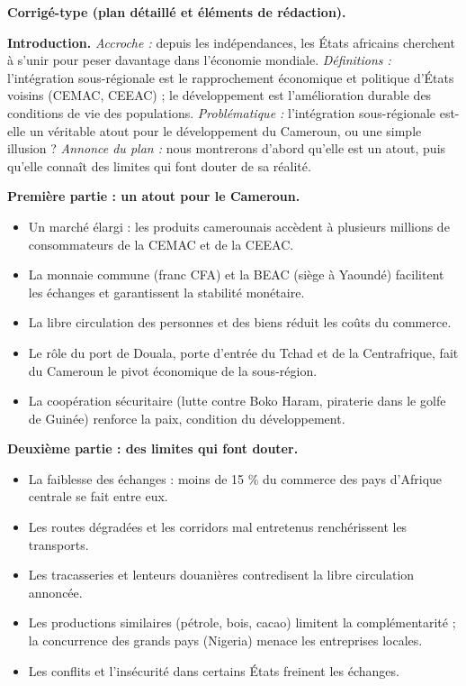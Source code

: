 \documentclass[11pt]{article}
\begin{document}
\begin{corrige}
\textbf{Corrigé-type (plan détaillé et éléments de rédaction).}

\textbf{Introduction.} \emph{Accroche :} depuis les indépendances, les États africains cherchent à s'unir pour peser davantage dans l'économie mondiale. \emph{Définitions :} l'intégration sous-régionale est le rapprochement économique et politique d'États voisins (CEMAC, CEEAC) ; le développement est l'amélioration durable des conditions de vie des populations. \emph{Problématique :} l'intégration sous-régionale est-elle un véritable atout pour le développement du Cameroun, ou une simple illusion ? \emph{Annonce du plan :} nous montrerons d'abord qu'elle est un atout, puis qu'elle connaît des limites qui font douter de sa réalité.

\textbf{Première partie : un atout pour le Cameroun.}
\begin{itemize}
\item Un marché élargi : les produits camerounais accèdent à plusieurs millions de consommateurs de la CEMAC et de la CEEAC.
\item La monnaie commune (franc CFA) et la BEAC (siège à Yaoundé) facilitent les échanges et garantissent la stabilité monétaire.
\item La libre circulation des personnes et des biens réduit les coûts du commerce.
\item Le rôle du port de Douala, porte d'entrée du Tchad et de la Centrafrique, fait du Cameroun le pivot économique de la sous-région.
\item La coopération sécuritaire (lutte contre Boko Haram, piraterie dans le golfe de Guinée) renforce la paix, condition du développement.
\end{itemize}

\textbf{Deuxième partie : des limites qui font douter.}
\begin{itemize}
\item La faiblesse des échanges : moins de 15 \% du commerce des pays d'Afrique centrale se fait entre eux.
\item Les routes dégradées et les corridors mal entretenus renchérissent les transports.
\item Les tracasseries et lenteurs douanières contredisent la libre circulation annoncée.
\item Les productions similaires (pétrole, bois, cacao) limitent la complémentarité ; la concurrence des grands pays (Nigeria) menace les entreprises locales.
\item Les conflits et l'insécurité dans certains États freinent les échanges.
\end{itemize}


\end{corrige}
\end{document}

